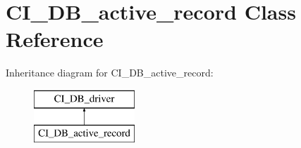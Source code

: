 \hypertarget{class_c_i___d_b__active__record}{\section{C\-I\-\_\-\-D\-B\-\_\-active\-\_\-record Class Reference}
\label{class_c_i___d_b__active__record}
}
Inheritance diagram for C\-I\-\_\-\-D\-B\-\_\-active\-\_\-record\-:\begin{figure}[H]
\begin{center}
\leavevmode
\includegraphics[height=2.000000cm]{class_c_i___d_b__active__record}
\end{center}
\end{figure}
